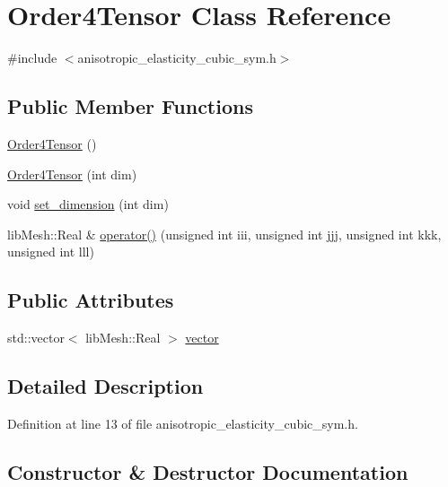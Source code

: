 \hypertarget{class_order4_tensor}{}\section{Order4\+Tensor Class Reference}
\label{class_order4_tensor}


{\ttfamily \#include $<$anisotropic\+\_\+elasticity\+\_\+cubic\+\_\+sym.\+h$>$}

\subsection*{Public Member Functions}
\begin{DoxyCompactItemize}
\item 
\hyperlink{class_order4_tensor_a3f8130422a7e64a9d1dbe764d5bee4e2}{Order4\+Tensor} ()
\item 
\hyperlink{class_order4_tensor_a91ac3e32ce3ad0e4334699e77783a295}{Order4\+Tensor} (int dim)
\item 
void \hyperlink{class_order4_tensor_af1900935b9a3e18edf46c24bac6027af}{set\+\_\+dimension} (int dim)
\item 
lib\+Mesh\+::\+Real \& \hyperlink{class_order4_tensor_ae2e5d607539ad64353deda3bb6ec623b}{operator()} (unsigned int iii, unsigned int jjj, unsigned int kkk, unsigned int lll)
\end{DoxyCompactItemize}
\subsection*{Public Attributes}
\begin{DoxyCompactItemize}
\item 
std\+::vector$<$ lib\+Mesh\+::\+Real $>$ \hyperlink{class_order4_tensor_acec0c420962426e3104218af2ad02b4d}{vector}
\end{DoxyCompactItemize}


\subsection{Detailed Description}


Definition at line 13 of file anisotropic\+\_\+elasticity\+\_\+cubic\+\_\+sym.\+h.



\subsection{Constructor \& Destructor Documentation}
\hypertarget{class_order4_tensor_a3f8130422a7e64a9d1dbe764d5bee4e2}{}
